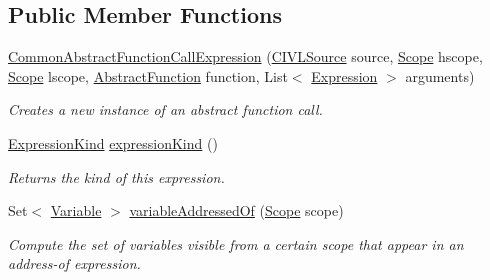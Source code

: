 \subsection*{Public Member Functions}
\begin{DoxyCompactItemize}
\item 
\hyperlink{classedu_1_1udel_1_1cis_1_1vsl_1_1civl_1_1model_1_1common_1_1expression_1_1CommonAbstractFunctionCallExpression_aba0474c5fed92657099b1e8967280da1}{Common\+Abstract\+Function\+Call\+Expression} (\hyperlink{interfaceedu_1_1udel_1_1cis_1_1vsl_1_1civl_1_1model_1_1IF_1_1CIVLSource}{C\+I\+V\+L\+Source} source, \hyperlink{interfaceedu_1_1udel_1_1cis_1_1vsl_1_1civl_1_1model_1_1IF_1_1Scope}{Scope} hscope, \hyperlink{interfaceedu_1_1udel_1_1cis_1_1vsl_1_1civl_1_1model_1_1IF_1_1Scope}{Scope} lscope, \hyperlink{interfaceedu_1_1udel_1_1cis_1_1vsl_1_1civl_1_1model_1_1IF_1_1AbstractFunction}{Abstract\+Function} function, List$<$ \hyperlink{interfaceedu_1_1udel_1_1cis_1_1vsl_1_1civl_1_1model_1_1IF_1_1expression_1_1Expression}{Expression} $>$ arguments)
\begin{DoxyCompactList}\small\item\em Creates a new instance of an abstract function call. \end{DoxyCompactList}\item 
\hyperlink{enumedu_1_1udel_1_1cis_1_1vsl_1_1civl_1_1model_1_1IF_1_1expression_1_1Expression_1_1ExpressionKind}{Expression\+Kind} \hyperlink{classedu_1_1udel_1_1cis_1_1vsl_1_1civl_1_1model_1_1common_1_1expression_1_1CommonAbstractFunctionCallExpression_a5fdc82fb55e61879f9e71d89ef7914eb}{expression\+Kind} ()
\begin{DoxyCompactList}\small\item\em Returns the kind of this expression. \end{DoxyCompactList}\item 
Set$<$ \hyperlink{interfaceedu_1_1udel_1_1cis_1_1vsl_1_1civl_1_1model_1_1IF_1_1variable_1_1Variable}{Variable} $>$ \hyperlink{classedu_1_1udel_1_1cis_1_1vsl_1_1civl_1_1model_1_1common_1_1expression_1_1CommonAbstractFunctionCallExpression_a6bfb61c9f9a33fff3b42895a79e058e4}{variable\+Addressed\+Of} (\hyperlink{interfaceedu_1_1udel_1_1cis_1_1vsl_1_1civl_1_1model_1_1IF_1_1Scope}{Scope} scope)
\begin{DoxyCompactList}\small\item\em Compute the set of variables visible from a certain scope that appear in an address-\/of expression. \end{DoxyCompactList}\item 

\end{DoxyCompactItemize}
